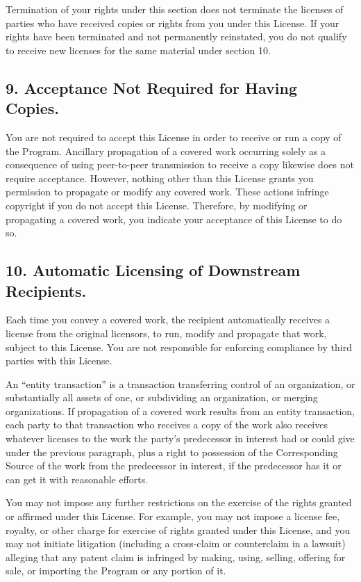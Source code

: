 \documentclass[letterpaper,10pt,english]{sphinxmanual}
\begin{document}
Termination of your rights under this section does not terminate the
licenses of parties who have received copies or rights from you under
this License.  If your rights have been terminated and not permanently
reinstated, you do not qualify to receive new licenses for the same
material under section 10.


\subsection{9. Acceptance Not Required for Having Copies.}
\label{license:acceptance-not-required-for-having-copies}
You are not required to accept this License in order to receive or
run a copy of the Program.  Ancillary propagation of a covered work
occurring solely as a consequence of using peer-to-peer transmission
to receive a copy likewise does not require acceptance.  However,
nothing other than this License grants you permission to propagate or
modify any covered work.  These actions infringe copyright if you do
not accept this License.  Therefore, by modifying or propagating a
covered work, you indicate your acceptance of this License to do so.


\subsection{10. Automatic Licensing of Downstream Recipients.}
\label{license:automatic-licensing-of-downstream-recipients}
Each time you convey a covered work, the recipient automatically
receives a license from the original licensors, to run, modify and
propagate that work, subject to this License.  You are not responsible
for enforcing compliance by third parties with this License.

An ``entity transaction'' is a transaction transferring control of an
organization, or substantially all assets of one, or subdividing an
organization, or merging organizations.  If propagation of a covered
work results from an entity transaction, each party to that
transaction who receives a copy of the work also receives whatever
licenses to the work the party's predecessor in interest had or could
give under the previous paragraph, plus a right to possession of the
Corresponding Source of the work from the predecessor in interest, if
the predecessor has it or can get it with reasonable efforts.

You may not impose any further restrictions on the exercise of the
rights granted or affirmed under this License.  For example, you may
not impose a license fee, royalty, or other charge for exercise of
rights granted under this License, and you may not initiate litigation
(including a cross-claim or counterclaim in a lawsuit) alleging that
any patent claim is infringed by making, using, selling, offering for
sale, or importing the Program or any portion of it.
\end{document}
